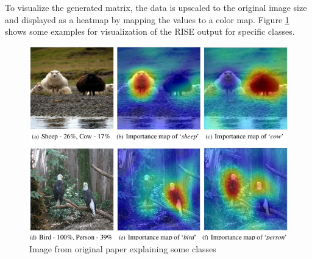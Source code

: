 To visualize the generated matrix, the data is upscaled to the original image size and displayed as a heatmap by mapping the values to a color map. Figure \ref{rise_example} shows some examples for visualization of the RISE output for specific classes.

\begin{figure}[H]
\centering
\includegraphics[width=12cm]{chapters/02_methods/images/rise/sheep.png}
\caption{Image from original paper explaining some classes}
\label{rise_example}
\end{figure}
